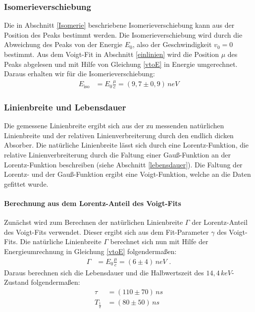 \subsubsection{Isomerieverschiebung}
Die in Abschnitt \ref{Isomerie} beschriebene Isomerieverschiebung kann aus der Position des Peaks bestimmt werden. Die Isomerieverschiebung wird durch die Abweichung des Peaks von der Energie $E_0$, also der Geschwindigkeit $v_0=0$ bestimmt. Aus dem Voigt-Fit in Abschnitt \ref{einlinien} wird die Position $\mu$ des Peaks abgelesen und mit Hilfe von Gleichung \ref{vtoE} in Energie umgerechnet. Daraus erhalten wir für die Isomerieverschiebung:
\begin{align}
	E_\mathrm{iso}&=E_0\frac{\mu}{c}=(9,7\pm0,9)\,\si{neV}
\end{align}
\subsubsection{Linienbreite und Lebensdauer}
Die gemessene Linienbreite ergibt sich aus der zu messenden natürlichen Linienbreite und der relativen Linienverbreiterung durch den endlich dicken Absorber. Die natürliche Linienbreite lässt sich durch eine Lorentz-Funktion, die relative Linienverbreiterung durch die Faltung einer Gauß-Funktion an der Lorentz-Funktion beschreiben (siehe Abschnitt \ref{lebensdauer}). Die Faltung der Lorentz- und der Gauß-Funktion ergibt eine Voigt-Funktion, welche an die Daten gefittet wurde.
\paragraph{Berechnung aus dem Lorentz-Anteil des Voigt-Fits}
Zunächst wird zum Berechnen der natürlichen Linienbreite $\Gamma$ der Lorentz-Anteil des Voigt-Fits verwendet. Dieser ergibt sich aus dem Fit-Parameter $\gamma$ des Voigt-Fits. Die natürliche Linienbreite $\Gamma$ berechnet sich nun mit Hilfe der Energieumrechnung in Gleichung \ref{vtoE} folgendermaßen:
\begin{align}
	\Gamma&=E_0\frac{\mu}{c}=(6\pm4)\,\si{neV}\text{ .}
\end{align}
Daraus berechnen sich die Lebensdauer und die Halbwertszeit des $14,4\,\si{keV}$-Zustand folgendermaßen:
\begin{align}
	\tau&=(110\pm70)\,\si{ns}\\
	T_{\frac12}&=(80\pm50)\,\si{ns}
\end{align}
